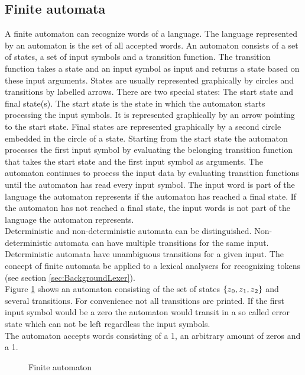 \subsection{Finite automata}\label{sec:BackgroundAutomata}
A finite automaton can recognize words of a language.
The language represented by an automaton is the set of all accepted words.
An automaton consists of a set of states, a set of input symbols and a transition function.
The transition function takes a state and an input symbol as input and returns a state based on these input arguments.
States are usually represented graphically by circles and transitions by labelled arrows.
There are two special states: The start state and final state(s).
The start state is the state in which the automaton starts processing the input symbols.
It is represented graphically by an arrow pointing to the start state.
Final states are represented graphically by a second circle embedded in the circle of a state.
Starting from the start state the automaton processes the first input symbol by evaluating the belonging transition function that takes the start state and the first input symbol as arguments. The automaton continues to process the input data by evaluating transition functions until the automaton has read every input symbol. The input word is part of the language the automaton represents if the automaton has reached a final state. If the automaton has not reached a final state, the input words is not part of the language the automaton represents.\\
Deterministic and non-deterministic automata can be distinguished.
Non-deterministic automata can have multiple transitions for the same input.
Deterministic automata have unambiguous transitions for a given input.
The concept of finite automata be applied to a lexical analysers for recognizing tokens (see section \ref{sec:BackgroundLexer}). \cite{AutomataTheory.2007}\\
Figure \ref{fig:FiniteAutomaton} shows an automaton consisting of the set of states $\{z\textsubscript{0}, z\textsubscript{1}, z\textsubscript{2}\}$ and several transitions. For convenience not all transitions are printed.
If the first input symbol would be a zero the automaton would transit in a so called error state which can not be left regardless the input symbols.\\
The automaton accepts words consisting of a 1, an arbitrary amount of zeros and a 1.

\begin{figure}[H]
\centering
{}
\caption{Finite automaton}
\label{fig:FiniteAutomaton}
\end{figure}

